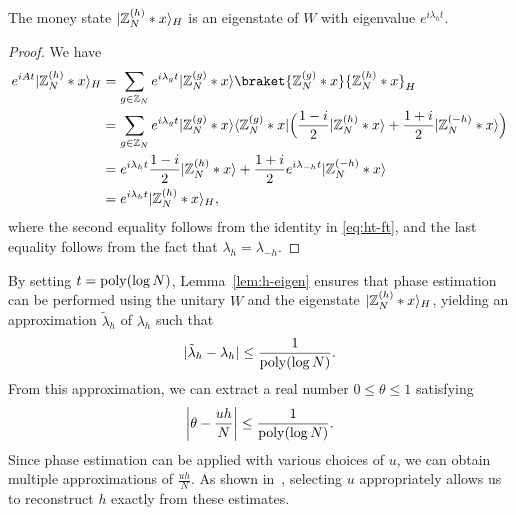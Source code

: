 \documentclass[11pt]{article}
\theoremstyle{definition}
\begin{document}
\begin{lemma}
    \label{lem:h-eigen}
    The money state $\ket{\Z_N^{(h)} * x}_H$ is an eigenstate of $W$ with eigenvalue $e^{i\lambda_h t}$.
\end{lemma}
\begin{proof}
    We have 
    \begin{align*}
        e^{iAt} \ket{\Z_N^{(h)} * x}_H
        & = \sum_{g \in \Z_N} e^{i\lambda_gt} \ket{\Z_N^{(g)} * x} \braket{\Z_N^{(g)} * x}{\Z_N^{(h)} * x}_H \\
        & = \sum_{g \in \Z_N} e^{i\lambda_gt} \ket{\Z_N^{(g)} * x} \bra{\Z_N^{(g)} * x} \Big( \frac{1 - i}{2} \ket{\Z_N^{(h)} * x} + \frac{1 + i}{2} \ket{\Z_N^{(-h)} * x} \Big) \\
        & = e^{i\lambda_{h}t} \frac{1 - i}{2} \ket{\Z_N^{(h)} * x} + \frac{1 + i}{2} e^{i\lambda_{-h}t} \ket{\Z_N^{(-h)} * x} \\
        & = e^{i\lambda_{h}t} \ket{\Z_N^{(h)} * x}_H,
    \end{align*}
    where the second equality follows from the identity in \eqref{eq:ht-ft}, and the last equality follows from the fact that $\lambda_h = \lambda_{-h}$.
\end{proof}


By setting \( t = \poly(\log N) \), Lemma~\ref{lem:h-eigen} ensures that phase estimation can be performed using the unitary \( W \) and the eigenstate \( \ket{\Z_N^{(h)} * x}_H \), yielding an approximation \( \tilde{\lambda}_h \) of \( \lambda_h \) such that
\[
\abs{\tilde{\lambda}_h - \lambda_h} \le \frac{1}{\poly(\log N)}.
\]
From this approximation, we can extract a real number \( 0 \le \theta \le 1 \) satisfying
\[
\abs*{\theta - \frac{uh}{N}} \le \frac{1}{\poly(\log N)}.
\]
Since phase estimation can be applied with various choices of \( u \), we can obtain multiple approximations of \( \frac{uh}{N} \). As shown in~\cite{zhandry2024quantum}, selecting \( u \) appropriately allows us to reconstruct \( h \) exactly from these estimates.











\end{document}
